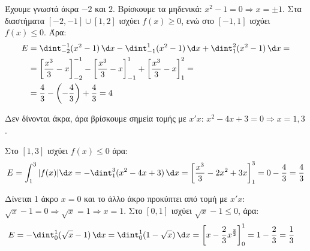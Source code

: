\lysh\vspace{-5mm}
\begin{alist}
\item 
Έχουμε γνωστά άκρα $-2$ και $2$. Βρίσκουμε τα μηδενικά: $x^2-1=0 \Rightarrow x=\pm 1$. Στα διαστήματα $[-2,-1]\cup[1,2]$ ισχύει $f(x)\ge 0$, ενώ στο $[-1,1]$ ισχύει $f(x)\le 0$. Άρα:
\begin{align*}
E&=\dint_{-2}^{-1}(x^2-1)\,\d x-\dint_{-1}^{1}(x^2-1)\,\d x+\dint_{1}^{2}(x^2-1)\,\d x=\\
&=\left[\frac{x^3}{3}-x\right]_{-2}^{-1}-\left[\frac{x^3}{3}-x\right]_{-1}^{1}+\left[\frac{x^3}{3}-x\right]_{1}^{2}=\\
&=\frac{4}{3}-\left(-\frac{4}{3}\right)+\frac{4}{3}=4
\end{align*}

\item Δεν δίνονται άκρα, άρα βρίσκουμε σημεία τομής με $x'x$: $x^2-4x+3=0 \Rightarrow x=1,3$. 
\begin{center}
\end{center}
Στο $[1,3]$ ισχύει $f(x)\le 0$ άρα:
\[
E=\int_{1}^{3}{|f(x)|\d x}=-\dint_{1}^{3}(x^2-4x+3)\,\d x=\left[\frac{x^3}{3}-2x^2+3x\right]_{1}^{3}=0-\frac{4}{3}=\frac{4}{3}
\]
\item Δίνεται 1 άκρο $x=0$ και το άλλο άκρο προκύπτει από τομή με $x'x$: $\sqrt{x}-1=0 \Rightarrow \sqrt{x}=1 \Rightarrow x=1$. Στο $[0,1]$ ισχύει $\sqrt{x}-1\le 0$, άρα:
\begin{align*}
E&=-\dint_{0}^{1}(\sqrt{x}-1)\,\d x=\dint_{0}^{1}(1-\sqrt{x})\,\d x=\left[x-\frac{2}{3}x^{\frac{3}{2}}\right]_{0}^{1}=1-\frac{2}{3}=\frac{1}{3}
\end{align*}
\end{alist}

